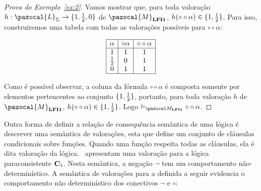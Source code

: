         \begin{proof}[Prova do Exemplo~\ref{ex:2}]
            Vamos mostrar que, para toda valoração $h : \pazocal{L}_{\Sigma} \to \{1,\meio{},0\}$ de $\pazocal{M}_{\lfium{}}$, $h(\circ \circ \alpha) \in \{1, \frac{1}{2}{}\}$. Para isso, construiremos uma tabela com todas as valorações possíveis para $\circ \circ \alpha$:
            \begin{center}
                \[
                    \begin{array}{|c|c|c|}%
                        \hline
                        \alpha      & \circ \alpha & \circ \circ \alpha   \\
                        \hline%
                        1           & 1            &    1\\
                        \meio{    } & 0            &    1\\
                        0           & 1            &    1\\
                        \hline
                    \end{array}
                \]
            \end{center}

            Como é possível observar, a coluna da fórmula $\circ \circ \alpha$ é composta somente por elementos pertencentes ao conjunto $\{1, \frac{1}{2}{}\}$, portanto, para toda valoração $h$ de $\pazocal{M}_{\lfium{}}$, $h(\circ \circ \alpha) \in \{1, \frac{1}{2}{}\}$. Logo $ \conmat \circ \circ \alpha$.
            
        \end{proof}

        
        Outra forma de definir a relação de consequência semântica de uma lógica é descrever uma semântica de valorações, esta que define um conjunto de cláusulas condicionais sobre funções. Quando uma função respeita todas as cláusulas, ela é dita valoração da lógica.~ apresentam uma valoração para a lógica paraconsistente $\text{\textbf{C}}_{1}$. Nesta semântica, a negação $\neg$ tem um comportamento não-determinístico. A semântica de valorações para a \lfium{} definida a seguir evidencia o comportamento não determinístico dos conectivos $\neg$ e $\circ$:

